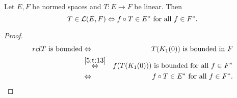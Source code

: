 \begin{kor} Let $E,F$ be normed spaces and $T\colon E\to F$ be linear. Then \[T\in\mathcal L(E,F)\Leftrightarrow f\circ T\in E^*\text{ for all }f\in F^*.\]
\end{kor}
\begin{proof}\hfill

\begin{align*}
	{rcl}T\text{ is bounded}&\Leftrightarrow&T(K_1(0))\text{ is bounded in }F\\&\overset{\ref{5:t:13}}{\Leftrightarrow}&f(T(K_1(0)))\text{ is bounded for all }f\in F^*\\&\Leftrightarrow&f\circ T\in E^*\text{ for all }f\in F^*.
\end{align*}
\end{proof}
